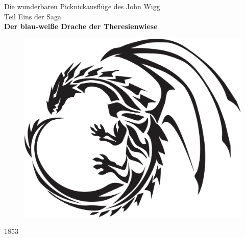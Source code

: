 \documentclass[titlepage, parksip=full]{scrartcl}
\begin{document}
\begin{titlepage}
\centering
\sffamily
\huge
Die wunderbaren Picknickausflüge des John Wigg \\
\vspace{2cm}
\normalsize 
Teil Eins der Saga\\
\rmfamily
\fontsize{32}{36}\selectfont 
\textbf{Der blau-weiße Drache der Theresienwiese}\\
\vspace{4cm}
\normalsize
\normalfont
\begin{figure}[h!]
\centering
\includegraphics[scale=0.2]{dragon.png}
\end{figure}
\vspace{2cm}
\normalsize
1853
\end{titlepage}
\end{document}
